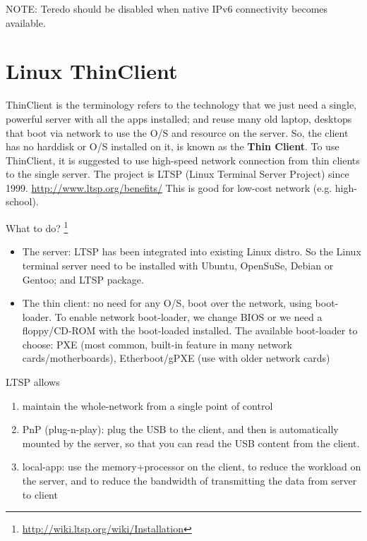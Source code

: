 NOTE: Teredo should be disabled when native IPv6 connectivity becomes available. 

\section{Linux ThinClient}
\label{sec:ThinClient_Linux}

ThinClient is the terminology refers to the technology that we just need a
single, powerful server with all the apps installed; and reuse many old laptop,
desktops that boot via network to use the O/S and resource on the server. So,
the client has no harddisk or O/S installed on it, is known as the {\bf Thin
Client}. To use ThinClient, it is suggested to use high-speed network
connection from thin clients to the single server. The project is LTSP (Linux
Terminal Server Project) since 1999.
\url{http://www.ltsp.org/benefits/} This is good for low-cost network (e.g.
high-school).

What to do? \footnote{\url{http://wiki.ltsp.org/wiki/Installation}}
\begin{itemize}
  \item The server: LTSP has been integrated into existing Linux distro. So the
  Linux terminal server need to be installed with Ubuntu, OpenSuSe, Debian or
  Gentoo; and LTSP package.
  
  \item The thin client: no need for any O/S, boot over the network, using
  boot-loader. To enable network boot-loader, we change BIOS or we need a
  floppy/CD-ROM with the boot-loaded installed. The available boot-loader to
  choose: PXE (most common, built-in feature in many network
  cards/motherboards), Etherboot/gPXE (use with older network cards)
  
\end{itemize}

LTSP allows
\begin{enumerate}
  \item maintain the whole-network from a single point of control
  \item PnP (plug-n-play): plug the USB to the client, and then is
  automatically mounted by the server, so that you can read the USB content from
  the client.
  \item local-app: use the memory+processor on the client, to reduce the
  workload on the server, and to reduce the bandwidth of transmitting the data
  from server to client
\end{enumerate}

